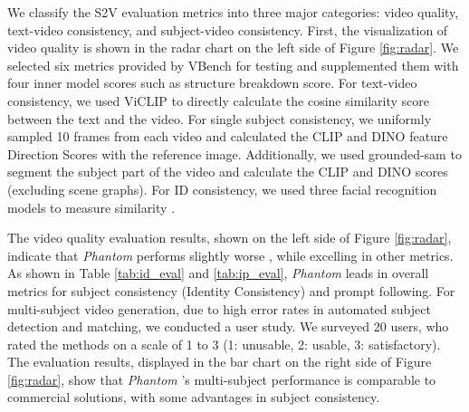 We classify the S2V evaluation metrics into three major categories: video quality, text-video consistency, and subject-video consistency. First, the visualization of video quality is shown in the radar chart on the left side of Figure \ref{fig:radar}. We selected six metrics provided by VBench \cite{huang2024vbench++}  for testing and supplemented them with four inner model scores such as structure breakdown score. For text-video consistency, we used ViCLIP \cite{wang2022internvideo} to directly calculate the cosine similarity score between the text and the video. For single subject consistency, we uniformly sampled 10 frames from each video and calculated the CLIP \cite{cherti2023reproducible} and DINO \cite{oquab2023dinov2} feature Direction Scores with the reference image. Additionally, we used grounded-sam to segment the subject part of the video and calculate the CLIP and DINO scores (excluding scene graphs). For ID consistency, we used three facial recognition models to measure similarity \cite{deng2019arcface, huang2020curricularface}. 

The video quality evaluation results, shown on the left side of Figure \ref{fig:radar}, indicate that \textit{Phantom} performs slightly worse \cite{huang2024vbench++}, while excelling in other metrics. As shown in Table \ref{tab:id_eval} and \ref{tab:ip_eval}, \textit{Phantom}  leads in overall metrics for subject consistency (Identity Consistency) and prompt following. For multi-subject video generation, due to high error rates in automated subject detection and matching, we conducted a user study. We surveyed 20 users, who rated the methods on a scale of 1 to 3 (1: unusable, 2: usable, 3: satisfactory). The evaluation results, displayed in the bar chart on the right side of Figure \ref{fig:radar}, show that \textit{Phantom} 's multi-subject performance is comparable to commercial solutions, with some advantages in subject consistency.

\begin{table}[t]
	\centering
	\caption{Comparison of different methods based on identity consistency and prompt following}
	\label{tab:id_eval}
\end{table}

